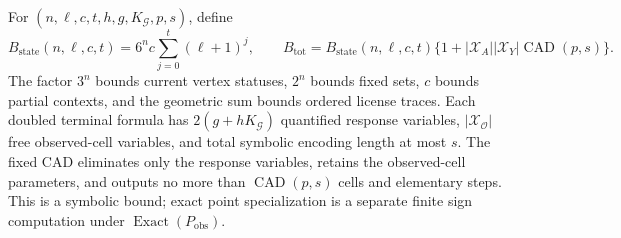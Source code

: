 For \((n,\ell,c,t,h,g,K_{\mathcal G},p,s)\), define
\[
B_{\mathrm{state}}(n,\ell,c,t)=6^n c\sum_{j=0}^{t}(\ell+1)^j,\qquad B_{\mathrm{tot}}=B_{\mathrm{state}}(n,\ell,c,t)\{1+|\mathcal X_A||\mathcal X_Y|\operatorname{CAD}(p,s)\}.
\]
The factor \(3^n\) bounds current vertex statuses, \(2^n\) bounds fixed sets, \(c\) bounds partial contexts, and the geometric sum bounds ordered license traces. Each doubled terminal formula has \(2(g+hK_{\mathcal G})\) quantified response variables, \(|\mathcal X_{\mathcal O}|\) free observed-cell variables, and total symbolic encoding length at most \(s\). The fixed CAD eliminates only the response variables, retains the observed-cell parameters, and outputs no more than \(\operatorname{CAD}(p,s)\) cells and elementary steps. This is a symbolic bound; exact point specialization is a separate finite sign computation under \(\operatorname{Exact}(P_{\mathrm{obs}})\).
